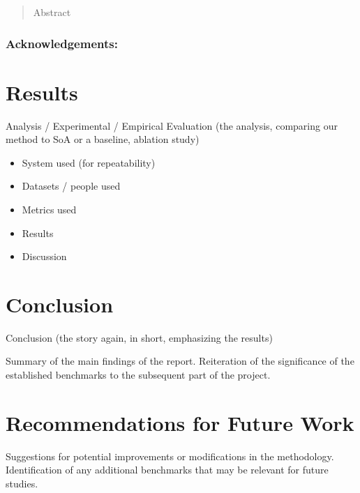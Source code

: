 
\newpage

\begin{abstract}
    Abstract
\end{abstract}

\maketitle

\subsubsection*{Acknowledgements:}









% 

\section{Results}
Analysis / Experimental / Empirical Evaluation (the analysis, comparing our method to SoA or a baseline, ablation study)
\begin{itemize}
    \item System used (for repeatability)
    \item Datasets / people used
    \item Metrics used
    \item Results
    \item Discussion
\end{itemize}

\section{Conclusion}
Conclusion (the story again, in short, emphasizing the results)

Summary of the main findings of the report.
Reiteration of the significance of the established benchmarks to the subsequent part of the project.

\section{Recommendations for Future Work}
Suggestions for potential improvements or modifications in the methodology.
Identification of any additional benchmarks that may be relevant for future studies.

